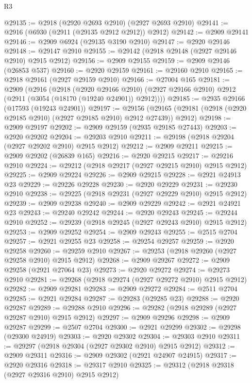 \begin{lexlean}{R3}
\begin{coremodule}
@29135 := @2918 (@2920 @2693 @2910) (@2927 @2693 @2910)
@29141 := @2916 (@6930 (@2911 (@29135 @2912 @2912)) @2912)
@29142 := @2909 @29141
@29146 := @2909 @6924 (@29135 @3190 @2910)
@29147 := @2920 @29146
@29148 := @29147 @2910
@29155 := @29142 (@2918 @29148 (@2927 @29146 @2910) @2915 @2912)
@29156 := @2909 @29155
@29159 := @2909 @29146 (@26853 @537)
@29160 := @2920 @29159
@29161 := @29160 @2910
@29165 := @2918 @29161 (@2927 @29159 @2910)
@29166 := @27004 @165
@29181 := @2909
    (@2916
      (@2918
        (@2920 @29166 @2910)
        (@2927 @29166 @2910)
        @2912
        (@2911 (@3054 (@18170 (@19240 @24901)) @2912))))
@29185 := @2935 @29166 (@17593 (@19243 @24901))
@29197 := @29156
    (@29165 (@29181 (@2918 (@2920 @29185 @2910) (@2927 @29185 @2910) @2912 @27439)) @2912)
@29198 := @2909 @29197
@29202 := @2909 @29159 (@2935 @29185 @27443)
@29203 := @2920 @29202
@29204 := @29203 @2910
@29211 := @29198 (@2918 @29204 (@2927 @29202 @2910) @2915 @2912)
@29212 := @2909 @29211
@29215 := @2909 @29202 (@26839 @165)
@29216 := @2920 @29215
@29217 := @29216 @2910
@29224 := @29212 (@2918 @29217 (@2927 @29215 @2910) @2915 @2912)
@29225 := @2909 @29224
@29226 := @2909 @29215
@29228 := @2921 @24913 @23
@29229 := @29226 @29228
@29230 := @2920 @29229
@29231 := @29230 @2910
@29238 := @29225 (@2918 @29231 (@2927 @29229 @2910) @2915 @2912)
@29239 := @2909 @29238
@29240 := @2909 @29229
@29242 := @2921 @24921 @23
@29243 := @29240 @29242
@29244 := @2920 @29243
@29245 := @29244 @2910
@29252 := @29239 (@2918 @29245 (@2927 @29243 @2910) @2915 @2912)
@29253 := @2909 @29252
@29254 := @2909 @29243
@29255 := @2515 @2704
@29257 := @2921 @29255 @23
@29258 := @29254 @29257
@29259 := @2920 @29258
@29260 := @29259 @2910
@29267 := @29253 (@2918 @29260 (@2927 @29258 @2910) @2915 @2912)
@29268 := @2909 @29267
@29272 := @2909 @29258 (@2921 @27064 @23)
@29273 := @2920 @29272
@29274 := @29273 @2910
@29281 := @29268 (@2918 @29274 (@2927 @29272 @2910) @2915 @2912)
@29282 := @2909 @29281
@29283 := @2909 @29272
@29284 := @2511 @2704
@29285 := @2921 @29284
@29287 := @29283 (@29285 @23)
@29288 := @2920 @29287
@29289 := @29288 @2910
@29296 := @29282 (@2918 @29289 (@2927 @29287 @2910) @2915 @2912)
@29297 := @2909 @29296
@29298 := @2909 @29287
@29299 := @2507 @2704
@29300 := @2921 @29299
@29302 := @29298 (@29300 @24919)
@29303 := @2920 @29302
@29304 := @29303 @2910
@29311 := @29297 (@2918 @29304 (@2927 @29302 @2910) @2915 @2912)
@29312 := @2909 @29311
@29316 := @2909 @29302 (@2921 @24907 @24915)
@29317 := @2920 @29316
@29318 := @29317 @2910
@29325 := @29312 (@2918 @29318 (@2927 @29316 @2910) @2915 @2912)

\end{coremodule}
\end{lexlean}
